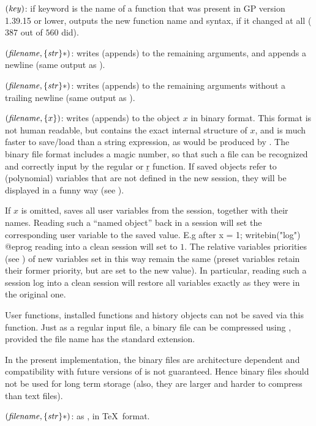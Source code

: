 $(\hbox{\it key\/})$: if keyword  is the name
of a function that was present in GP version 1.39.15 or lower, outputs
the new function name and syntax, if it changed at all ($387$ out of $560$
did).\label{se:whatnow}

$(\hbox{\it filename\/},\{\hbox{\it str\/}\}*)$: writes (appends)
to  the remaining arguments, and appends a newline (same output
as ).\label{se:write}

$(\hbox{\it filename\/},\{\hbox{\it str\/}\}*)$: writes (appends) to
 the remaining arguments without a trailing newline
(same output as ).

$(\hbox{\it filename\/},\{x\})$: writes (appends) to
 the object $x$ in binary format. This format is not human
readable, but contains the exact internal structure of $x$, and is much
faster to save/load than a string expression, as would be produced by
. The binary file format includes a magic number, so that such a
file can be recognized and correctly input by the regular  or \b{r}
function. If saved objects refer to (polynomial) variables that are not
defined in the new session, they will be displayed in a funny way (see
).

If $x$ is omitted, saves all user variables from the session, together with
their names. Reading such a ``named object'' back in a  session will set
the corresponding user variable to the saved value. E.g after
\bprog
x = 1; writebin("log")
@eprog
\noindent reading  into a clean session will set  to $1$.
The relative variables priorities (see ) of new variables
set in this way remain the same (preset variables retain their former
priority, but are set to the new value). In particular, reading such a
session log into a clean session will restore all variables exactly as they
were in the original one.

User functions, installed functions and history objects can not be saved via
this function. Just as a regular input file, a binary file can be compressed
using , provided the file name has the standard 
extension. \label{se:writebin}

In the present implementation, the binary files are architecture dependent
and compatibility with future versions of  is not guaranteed. Hence
binary files should not be used for long term storage (also, they are
larger and harder to compress than text files).

$(\hbox{\it filename\/},\{\hbox{\it str\/}\}*)$: as ,
in \TeX\ format.\label{se:writetex}

\vfill\eject
